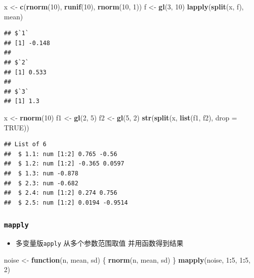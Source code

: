 \documentclass[]{book}
\newenvironment{Shaded}{\begin{snugshade}}{\end{snugshade}}
\newcommand{\ControlFlowTok}[1]{\textcolor[rgb]{0.13,0.29,0.53}{\textbf{#1}}}
\newcommand{\DataTypeTok}[1]{\textcolor[rgb]{0.13,0.29,0.53}{#1}}
\newcommand{\DecValTok}[1]{\textcolor[rgb]{0.00,0.00,0.81}{#1}}
\newcommand{\KeywordTok}[1]{\textcolor[rgb]{0.13,0.29,0.53}{\textbf{#1}}}
\newcommand{\NormalTok}[1]{#1}
\newcommand{\OperatorTok}[1]{\textcolor[rgb]{0.81,0.36,0.00}{\textbf{#1}}}
\newcommand{\OtherTok}[1]{\textcolor[rgb]{0.56,0.35,0.01}{#1}}
\newcommand{\StringTok}[1]{\textcolor[rgb]{0.31,0.60,0.02}{#1}}
\providecommand{\tightlist}{%
  \setlength{\itemsep}{0pt}\setlength{\parskip}{0pt}}
\begin{document}
\begin{Shaded}
\begin{Highlighting}[]
\NormalTok{x <-}\StringTok{ }\KeywordTok{c}\NormalTok{(}\KeywordTok{rnorm}\NormalTok{(}\DecValTok{10}\NormalTok{), }\KeywordTok{runif}\NormalTok{(}\DecValTok{10}\NormalTok{), }\KeywordTok{rnorm}\NormalTok{(}\DecValTok{10}\NormalTok{, }\DecValTok{1}\NormalTok{))}
\NormalTok{f <-}\StringTok{ }\KeywordTok{gl}\NormalTok{(}\DecValTok{3}\NormalTok{, }\DecValTok{10}\NormalTok{)}
\KeywordTok{lapply}\NormalTok{(}\KeywordTok{split}\NormalTok{(x, f), mean)}
\end{Highlighting}
\end{Shaded}

\begin{verbatim}
## $`1`
## [1] -0.148
## 
## $`2`
## [1] 0.533
## 
## $`3`
## [1] 1.3
\end{verbatim}

\begin{Shaded}
\begin{Highlighting}[]
\NormalTok{x <-}\StringTok{ }\KeywordTok{rnorm}\NormalTok{(}\DecValTok{10}\NormalTok{)}
\NormalTok{f1 <-}\StringTok{ }\KeywordTok{gl}\NormalTok{(}\DecValTok{2}\NormalTok{, }\DecValTok{5}\NormalTok{)}
\NormalTok{f2 <-}\StringTok{ }\KeywordTok{gl}\NormalTok{(}\DecValTok{5}\NormalTok{, }\DecValTok{2}\NormalTok{)}
\KeywordTok{str}\NormalTok{(}\KeywordTok{split}\NormalTok{(x, }\KeywordTok{list}\NormalTok{(f1, f2), }\DataTypeTok{drop =} \OtherTok{TRUE}\NormalTok{))}
\end{Highlighting}
\end{Shaded}

\begin{verbatim}
## List of 6
##  $ 1.1: num [1:2] 0.765 -0.56
##  $ 1.2: num [1:2] -0.365 0.0597
##  $ 1.3: num -0.878
##  $ 2.3: num -0.682
##  $ 2.4: num [1:2] 0.274 0.756
##  $ 2.5: num [1:2] 0.0194 -0.9514
\end{verbatim}

\hypertarget{mapply}{%
\subsubsection{\texorpdfstring{\texttt{mapply}}{mapply}}\label{mapply}}

\begin{itemize}
\tightlist
\item
  多变量版\texttt{apply} 从多个参数范围取值 并用函数得到结果
\end{itemize}

\begin{Shaded}
\begin{Highlighting}[]
\NormalTok{noise <-}\StringTok{ }\ControlFlowTok{function}\NormalTok{(n, mean, sd) \{}
  \KeywordTok{rnorm}\NormalTok{(n, mean, sd)}
\NormalTok{\}}
\KeywordTok{mapply}\NormalTok{(noise, }\DecValTok{1}\OperatorTok{:}\DecValTok{5}\NormalTok{, }\DecValTok{1}\OperatorTok{:}\DecValTok{5}\NormalTok{, }\DecValTok{2}\NormalTok{)}
\end{Highlighting}
\end{Shaded}
\end{document}
